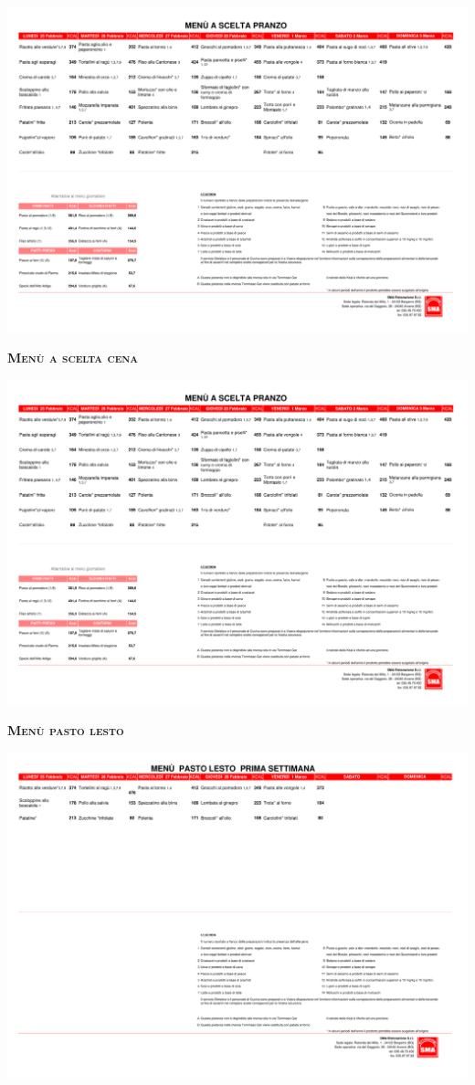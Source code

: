 \documentclass{article}
\begin{document}
\includegraphics[trim=0cm 16cm 0cm 2cm,clip,page=5,width=\textwidth,]{scelta.pdf}
\vspace{0.3cm}
\begin{center}
{\Huge \textbf{\textsc{Menù a scelta cena}}}\\
\end{center}
\includegraphics[trim=0cm 17cm 0cm 2cm,clip,page=6,width=\textwidth,]{scelta.pdf}
\vspace{0.3cm}
\begin{center}
{\Huge \textbf{\textsc{Menù pasto lesto}}}\\
\end{center}
\includegraphics[trim=0cm 23cm 0cm 2cm,clip,page=3,width=\textwidth,]{lesto.pdf}
\end{document}
